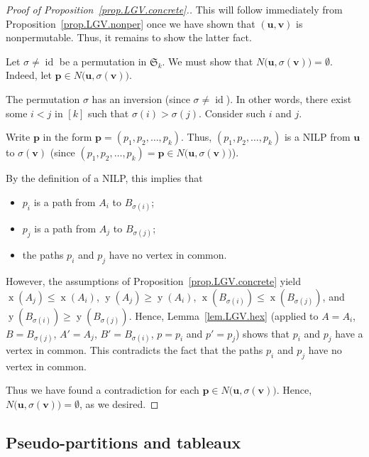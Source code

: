 \documentclass[reqno]{amsart}
\newcommand{\0}{\phantom{c}}
\newcommand{\SymGp}[1]{\mathfrak{S}_{#1}} %
\DeclareMathOperator{\xcoord}{x} %
\DeclareMathOperator{\ycoord}{y} %
\DeclareMathOperator{\id}{id} %
\newcommand{\pp}{\mathbf{p}}
\newcommand{\uu}{\mathbf{u}}
\newcommand{\vv}{\mathbf{v}}
\newenvironment{verlong}{}{}
\newcommand{\tup}[1]{\left( #1 \right)}
\newcommand{\ive}[1]{\left[ #1 \right]}
\theoremstyle{plain}
\theoremstyle{definition}
\numberwithin{equation}{section}
\begin{document}
\begin{verlong}
\begin{proof}[Proof of Proposition~\ref{prop.LGV.concrete}.]
This will follow immediately from Proposition~\ref{prop.LGV.nonper}
once we have shown that $\left( \uu,\vv\right)  $ is nonpermutable.
Thus, it remains to show the latter fact.

Let $\sigma\neq\id$ be a permutation in $\SymGp{k}$.
We must show that $N\bigl(\uu, \sigma(\vv) \bigr) = \emptyset$.
Indeed, let $\pp\in N\bigl( \uu,\sigma(\vv) \bigr)$.

The permutation $\sigma$ has an inversion (since $\sigma \neq \id$).
In other words, there exist some $i<j$ in $\ive{k}$ such that $\sigma(i) > \sigma(j)$.
Consider such $i$ and $j$.

Write $\pp$ in the form $\pp = \tup{p_1, p_2, \dotsc, p_k}$.
Thus, $\tup{p_1, p_2, \dotsc, p_k}$ is a NILP from $\uu$ to $\sigma(\vv)$ (since $\tup{p_1, p_2, \dotsc, p_k} = \pp\in N\bigl( \uu, \sigma(\vv) \bigr)$).

By the definition of a NILP, this implies that
\begin{itemize}
\item $p_i$ is a path from $A_i$ to $B_{\sigma(i)}$;

\item $p_j$ is a path from $A_j$ to $B_{\sigma(j)}$;

\item the paths $p_i$ and $p_j$ have no vertex in common.
\end{itemize}

However, the assumptions of Proposition~\ref{prop.LGV.concrete} yield
$\xcoord(A_j) \leq \xcoord(A_i)$,
$\ycoord(A_j) \geq \ycoord(A_i)$,
$\xcoord(B_{\sigma(i)}) \leq \xcoord(B_{\sigma(j)})$, and
$\ycoord(B_{\sigma(i)}) \geq \ycoord(B_{\sigma(j)})$.
Hence, Lemma~\ref{lem.LGV.hex} (applied to $A = A_i$, $B = B_{\sigma(j)}$, $A' = A_j$, $B' = B_{\sigma(i)}$, $p = p_i$ and $p' = p_j$) shows that $p_i$ and $p_j$ have a vertex in common.
This contradicts the fact that the paths $p_i$ and $p_j$ have no vertex in common.

Thus we have found a contradiction for each $\pp\in N\bigl( \uu,\sigma(\vv) \bigr)$.
Hence, $N\bigl(\uu, \sigma(\vv) \bigr) = \emptyset$, as we desired.
\end{proof}
\end{verlong}

\subsection{Pseudo-partitions and tableaux}
\end{document}
